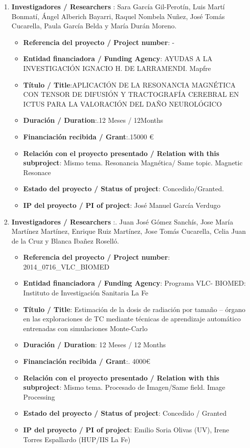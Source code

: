 \begin{enumerate}
 \item {\bf Investigadores / Researchers }: Sara García Gil-Perotín, Luis Martí Bonmatí, Ángel Alberich Bayarri, Raquel Nombela Nuñez, José Tomás Cucarella, Paula García Belda y María Durán Moreno.
 \begin{itemize}
 \item {\bf Referencia del proyecto / Project number}: -
 \item {\bf Entidad financiadora / Funding Agency}: AYUDAS A LA INVESTIGACIÓN IGNACIO H. DE LARRAMENDI. Mapfre
 \item {\bf Título / Title}:APLICACIÓN DE LA RESONANCIA MAGNÉTICA CON TENSOR DE DIFUSIÓN Y TRACTOGRAFÍA CEREBRAL EN ICTUS PARA LA VALORACIÓN DEL DAÑO NEUROLÓGICO 
 \item {\bf Duración / Duration}:.12 Meses / 12Months
 \item {\bf Financiación recibida / Grant}:.15000 \euro
 \item {\bf Relación con el proyecto presentado / Relation with this subproject}: Mismo tema. Resonancia Magnética/ Same topic. Magnetic Resonace
 \item {\bf Estado del proyecto / Status of project}: Concedido/Granted. 
 \item {\bf IP del proyecto / PI of project}: José Manuel García Verdugo
 \end{itemize}


 \item {\bf Investigadores / Researchers }:. Juan José Gómez Sanchís, Jose María Martínez Martínez, Enrique Ruiz Martínez, Jose Tomás Cucarella, Celia Juan de la Cruz y Blanca Ibañez Roselló. 
 \begin{itemize}
 \item {\bf Referencia del proyecto / Project number}: 2014\_0716\_VLC\_BIOMED
 \item {\bf Entidad financiadora / Funding Agency}: Programa VLC- BIOMED: Instituto de Investigación Sanitaria La Fe
 \item {\bf Título / Title}: Estimación de la dosis de radiación por tamaño – órgano en las exploraciones de TC mediante técnicas de aprendizaje automático entrenadas con simulaciones Monte-Carlo 
 \item {\bf Duración / Duration}: 12 Meses / 12 Months
 \item {\bf Financiación recibida / Grant}:. 4000\euro
 \item {\bf Relación con el proyecto presentado / Relation with this subproject}: Mismo tema. Procesado de Imagen/Same field. Image Processing
 \item {\bf Estado del proyecto / Status of project}: Concedido / Granted
 \item {\bf IP del proyecto / PI of project}: Emilio Soria Olivas (UV), Irene Torres Espallardo (HUP/IIS La Fe)
 \end{itemize}


\end{enumerate}
